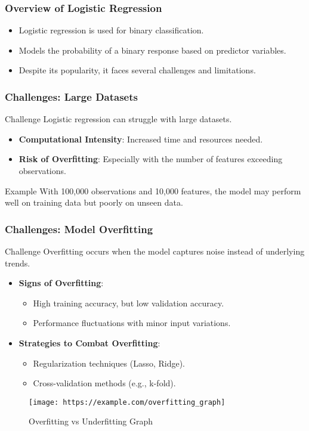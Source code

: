 \documentclass[aspectratio=169]{beamer}
\begin{document}
\begin{frame}
    \frametitle{Overview of Logistic Regression}
    \begin{itemize}
        \item Logistic regression is used for binary classification.
        \item Models the probability of a binary response based on predictor variables.
        \item Despite its popularity, it faces several challenges and limitations.
    \end{itemize}
\end{frame}

\begin{frame}
    \frametitle{Challenges: Large Datasets}
    \begin{block}{Challenge}
        Logistic regression can struggle with large datasets.
    \end{block}
    \begin{itemize}
        \item \textbf{Computational Intensity}: Increased time and resources needed.
        \item \textbf{Risk of Overfitting}: Especially with the number of features exceeding observations.
    \end{itemize}
    \begin{exampleblock}{Example}
        With 100,000 observations and 10,000 features, the model may perform well on training data but poorly on unseen data.
    \end{exampleblock}
\end{frame}

\begin{frame}
    \frametitle{Challenges: Model Overfitting}
    \begin{block}{Challenge}
        Overfitting occurs when the model captures noise instead of underlying trends.
    \end{block}
    \begin{itemize}
        \item \textbf{Signs of Overfitting}:
            \begin{itemize}
                \item High training accuracy, but low validation accuracy.
                \item Performance fluctuations with minor input variations.
            \end{itemize}
        \item \textbf{Strategies to Combat Overfitting}:
            \begin{itemize}
                \item Regularization techniques (Lasso, Ridge).
                \item Cross-validation methods (e.g., k-fold).
            \end{itemize}
    \end{itemize}
    \begin{figure}
        \centering
        \texttt{[image: https://example.com/overfitting\_graph]}
        \caption{Overfitting vs Underfitting Graph}
    \end{figure}
\end{frame}
\end{document}
